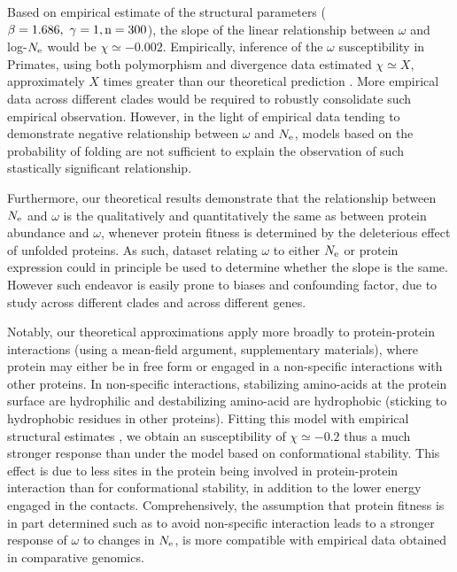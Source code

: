 \documentclass{article}
\begin{document}
	Based on empirical estimate of the structural parameters ($\beta = 1.686,\ \gamma=1, \text{n}=300$), the slope of the linear relationship between $\omega$ and log-$N_{\mathrm{e}}$ would be $\chi \simeq -0.002$.
	Empirically, inference of the $\omega$ susceptibility in Primates, using both polymorphism and divergence data estimated $\chi \simeq X$, approximately $X$ times greater than our theoretical prediction \cite{Brevet2019}.
	More empirical data across different clades would be required to robustly consolidate such empirical observation.
	However, in the light of empirical data tending to demonstrate negative relationship between $\omega$ and $N_{\mathrm{e}}$, models based on the probability of folding are not sufficient to explain the observation of such stastically significant relationship.
	
	Furthermore, our theoretical results demonstrate that the relationship between $N_{\mathrm{e}}$ and $\omega$ is the qualitatively and quantitatively the same as between protein abundance and $\omega$, whenever protein fitness is determined by the deleterious effect of unfolded proteins.
	As such, dataset relating $\omega$ to either $N_{\mathrm{e}}$ or protein expression could in principle be used to determine whether the slope is the same.
	However such endeavor is easily prone to biases and confounding factor, due to study across different clades and across different genes.
	
	Notably, our theoretical approximations apply more broadly to protein-protein interactions (using a mean-field argument, supplementary materials), where protein may either be in free form or engaged in a non-specific interactions with other proteins. 
	In non-specific interactions, stabilizing amino-acids at the protein surface are hydrophilic and destabilizing amino-acid are hydrophobic (sticking to  hydrophobic residues in other proteins).
	Fitting this model with empirical structural estimates \cite{Zhang2008}, we obtain an susceptibility of $\chi \simeq -0.2$ thus a much stronger response than under the model based on conformational stability.
	This effect is due to less sites in the protein being involved in protein-protein interaction than for conformational stability, in addition to the lower energy engaged in the contacts.
	Comprehensively, the assumption that protein fitness is in part determined such as to avoid non-specific interaction leads to a stronger response of $\omega$ to changes in $N_{\mathrm{e}}$, is more compatible with empirical data obtained in comparative genomics.
	
\end{document}
